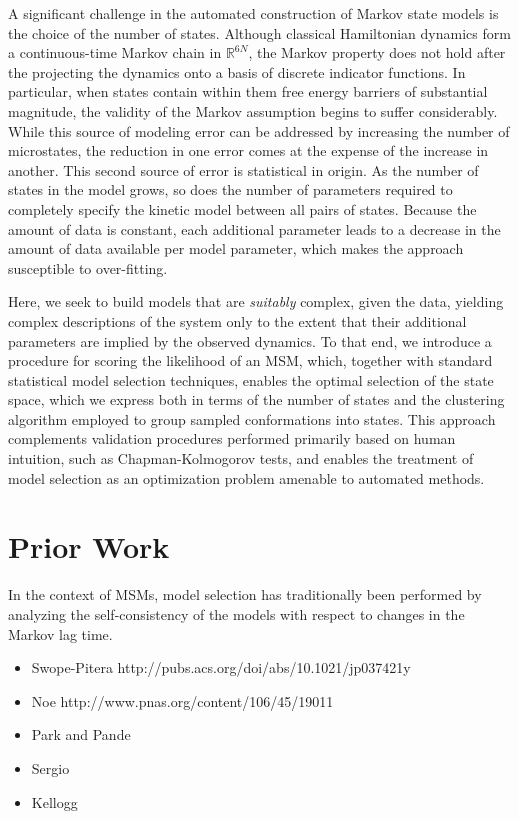 \documentclass[twocolumn,floatfix,nofootinbib,aps]{revtex4-1}
\begin{document}
A significant challenge in the automated construction of Markov state models is the choice of the number of states\cite{McGibbon2013Learning}. Although classical Hamiltonian dynamics form a continuous-time Markov chain in $\mathbb{R}^{6N}$, the Markov property does not hold after the projecting the dynamics onto a basis of discrete indicator functions. In particular, when states contain within them free energy barriers of substantial magnitude, the validity of the Markov assumption begins to suffer considerably. While this source of modeling error can be addressed by increasing the number of microstates, the reduction in one error comes at the expense of the increase in another. This second source of error is statistical in origin. As the number of states in the model grows, so does the number of parameters required to completely specify the kinetic model between all pairs of states. Because the amount of data is constant, each additional parameter leads to a decrease in the amount of data available per model parameter, which makes the approach susceptible to over-fitting.

Here, we seek to build models that are \emph{suitably} complex, given the data, yielding complex descriptions of the system only to the extent that their additional parameters are implied by the observed dynamics. To that end, we introduce a procedure for scoring the likelihood of an MSM, which, together with standard statistical model selection techniques, enables the optimal selection of the state space, which we express both in terms of the number of states and the clustering algorithm employed to group sampled conformations into states. This approach complements validation procedures performed primarily based on human intuition, such as Chapman-Kolmogorov tests, and enables the treatment of model selection as an optimization problem amenable to automated methods.

\section{Prior Work}
In the context of MSMs, model selection has traditionally been performed by analyzing the self-consistency of the models with respect to changes in the Markov lag time.

\begin{itemize}
\item Swope-Pitera http://pubs.acs.org/doi/abs/10.1021/jp037421y
\item Noe http://www.pnas.org/content/106/45/19011
\item Park and Pande
\item Sergio
\item Kellogg
\end{itemize}
\end{document}
